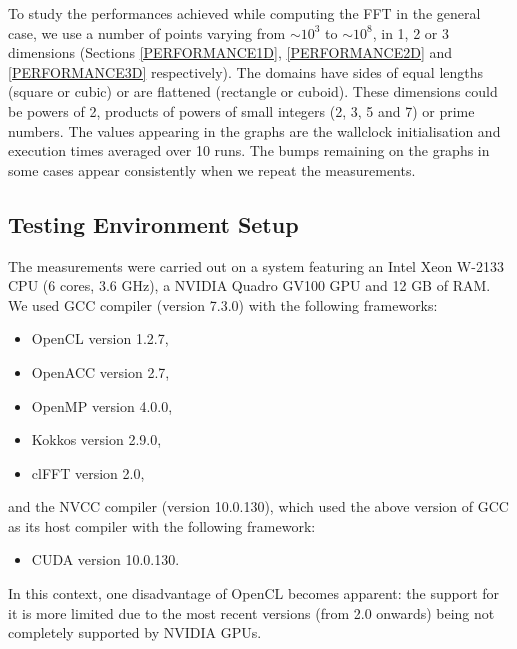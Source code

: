 \documentclass[12pt, a4paper]{article}
\begin{document}
To study the performances achieved while computing the FFT in the
general case, we use a number of points varying from $\sim 10^3$ to
$\sim 10^8$, in 1, 2 or 3 dimensions (Sections \ref{PERFORMANCE1D},
\ref{PERFORMANCE2D} and \ref{PERFORMANCE3D} respectively). The domains
have sides of equal lengths (square or cubic) or are flattened
(rectangle or cuboid). These dimensions could be powers of 2, products
of powers of small integers (2, 3, 5 and 7) or prime numbers. The
values appearing in the graphs are the wallclock initialisation and execution
times averaged over 10 runs. The bumps remaining on the graphs in some
cases appear consistently when we repeat the measurements.

\subsection{Testing Environment Setup}

The measurements were carried out on a system featuring an Intel Xeon
W-2133 CPU (6 cores, 3.6 GHz), a NVIDIA Quadro GV100 GPU and 12 GB of
RAM. We used GCC compiler (version 7.3.0) with the following frameworks:
\begin{itemize}
 \item OpenCL version 1.2.7,
 \item OpenACC version 2.7,
 \item OpenMP version 4.0.0,
 \item Kokkos version 2.9.0,
 \item clFFT version 2.0,
\end{itemize}
and the NVCC compiler (version 10.0.130), which used the above version
of GCC as its host compiler with the following framework:
\begin{itemize}
\item CUDA version 10.0.130.
\end{itemize}


In this context, one disadvantage of OpenCL becomes
apparent: the support for it is more limited due to the most recent versions
(from 2.0 onwards) being not completely supported by NVIDIA GPUs.
\end{document}
